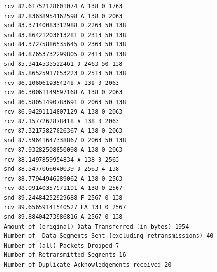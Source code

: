 \documentclass[11pt]{article}
\begin{document}
\begin{verbatim}
rcv 82.61752128601074 A 138 0 1763
rcv 82.83638954162598 A 138 0 2063
snd 83.37140083312988 D 2263 50 138
snd 83.86421203613281 D 2313 50 138
snd 84.37275886535645 D 2363 50 138
snd 84.87653732299805 D 2413 50 138
snd 85.3414535522461 D 2463 50 138
snd 85.86525917053223 D 2513 50 138
rcv 86.1060619354248 A 138 0 2063
rcv 86.30061149597168 A 138 0 2063
snd 86.58051490783691 D 2063 50 138
rcv 86.94291114807129 A 138 0 2063
rcv 87.1577262878418 A 138 0 2063
rcv 87.32175827026367 A 138 0 2063
snd 87.59641647338867 D 2063 50 138
rcv 87.93282508850098 A 138 0 2063
rcv 88.1497859954834 A 138 0 2563
snd 88.5477066040039 D 2563 4 138
rcv 88.77944946289062 A 138 0 2563
rcv 88.99140357971191 A 138 0 2567
snd 89.24484252929688 F 2567 0 138
rcv 89.65659141540527 FA 138 0 2567
snd 89.88404273986816 A 2567 0 138
Amount of (original) Data Transferred (in bytes) 1954
Number of  Data Segments Sent (excluding retransmissions) 40
Number of (all) Packets Dropped 7
Number of Retransmitted Segments 16
Number of Duplicate Acknowledgements received 20

\end{verbatim}
\end{document}
